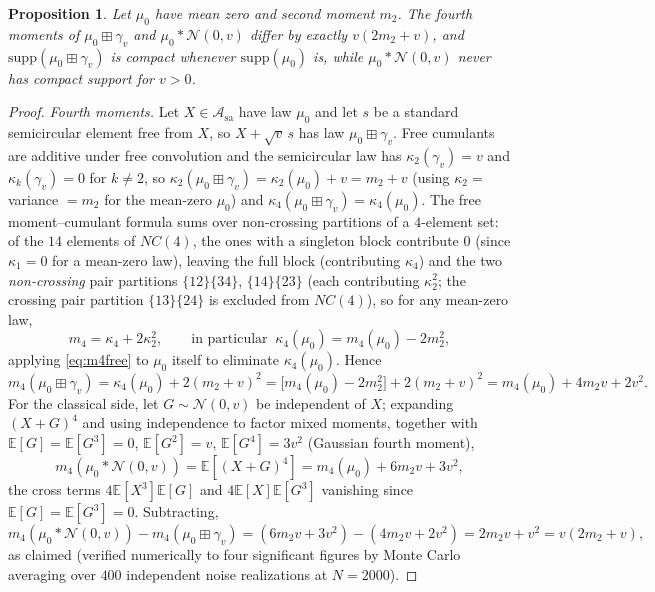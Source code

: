 \documentclass[11pt]{article}
\newcommand{\Asa}{\mathcal{A}_{\mathrm{sa}}}
\theoremstyle{plain}
\newtheorem{proposition}[theorem]{Proposition}
\theoremstyle{definition}
\theoremstyle{remark}
\begin{document}
\begin{proposition}\label{prop:freevsclassical}
Let $\mu_0$ have mean zero and second moment $m_2$. The fourth moments of
$\mu_0\boxplus\gamma_v$ and $\mu_0*\mathcal N(0,v)$ differ by exactly $v(2m_2+v)$, and
$\mathrm{supp}(\mu_0\boxplus\gamma_v)$ is compact whenever $\mathrm{supp}(\mu_0)$ is,
while $\mu_0*\mathcal N(0,v)$ never has compact support for $v>0$.
\end{proposition}

\begin{proof}
\emph{Fourth moments.} Let $X\in\Asa$ have law $\mu_0$ and let $s$ be a standard
semicircular element free from $X$, so $X+\sqrt v\,s$ has law $\mu_0\boxplus\gamma_v$.
Free cumulants are additive under free convolution and the semicircular law has
$\kappa_2(\gamma_v)=v$ and $\kappa_k(\gamma_v)=0$ for $k\ne2$, so
$\kappa_2(\mu_0\boxplus\gamma_v)=\kappa_2(\mu_0)+v=m_2+v$ (using $\kappa_2=$ variance
$=m_2$ for the mean-zero $\mu_0$) and $\kappa_4(\mu_0\boxplus\gamma_v)=\kappa_4(\mu_0)$.
The free moment--cumulant formula sums over non-crossing partitions of a $4$-element
set: of the $14$ elements of $NC(4)$, the ones with a singleton block contribute $0$
(since $\kappa_1=0$ for a mean-zero law), leaving the full block (contributing
$\kappa_4$) and the two \emph{non-crossing} pair partitions $\{12\}\{34\}$,
$\{14\}\{23\}$ (each contributing $\kappa_2^2$; the crossing pair partition
$\{13\}\{24\}$ is excluded from $NC(4)$), so for any mean-zero law,
\begin{equation}\label{eq:m4free}
  m_4 = \kappa_4 + 2\kappa_2^2,\qquad\text{in particular }\ \kappa_4(\mu_0)=m_4(\mu_0)-2m_2^2,
\end{equation}
applying \eqref{eq:m4free} to $\mu_0$ itself to eliminate $\kappa_4(\mu_0)$. Hence
\[
  m_4(\mu_0\boxplus\gamma_v) = \kappa_4(\mu_0)+2(m_2+v)^2
  = \big[m_4(\mu_0)-2m_2^2\big] + 2(m_2+v)^2 = m_4(\mu_0)+4m_2v+2v^2.
\]
For the classical side, let $G\sim\mathcal N(0,v)$ be independent of $X$; expanding
$(X+G)^4$ and using independence to factor mixed moments, together with
$\mathbb E[G]=\mathbb E[G^3]=0$, $\mathbb E[G^2]=v$, $\mathbb E[G^4]=3v^2$ (Gaussian
fourth moment),
\[
  m_4(\mu_0*\mathcal N(0,v)) = \mathbb E[(X+G)^4]
  = m_4(\mu_0) + 6m_2 v + 3v^2,
\]
the cross terms $4\mathbb E[X^3]\mathbb E[G]$ and $4\mathbb E[X]\mathbb E[G^3]$ vanishing
since $\mathbb E[G]=\mathbb E[G^3]=0$. Subtracting,
\[
  m_4(\mu_0*\mathcal N(0,v)) - m_4(\mu_0\boxplus\gamma_v)
  = (6m_2v+3v^2)-(4m_2v+2v^2) = 2m_2v+v^2 = v(2m_2+v),
\]
as claimed (verified numerically to four significant figures by Monte Carlo averaging
over $400$ independent noise realizations at $N=2000$).


\end{proof}
\end{document}

